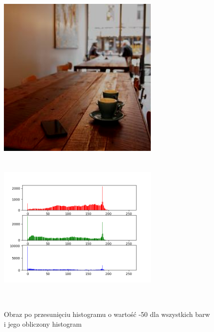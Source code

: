 \documentclass[a4paper,12pt]{book}
\begin{document}
\begin{figure}[H]
	\caption{Obraz po przesunięciu histogramu o wartość -50 dla wszystkich barw i jego obliczony histogram}
	\includegraphics[width=8cm, height=8cm]{6-2/move-histogram-image-coffee-(-50,-50,-50).png}
	\includegraphics[width=8cm, height=8cm]{6-2/move-histogram-coffee-(-50,-50,-50).png}
\end{figure}
\end{document}
